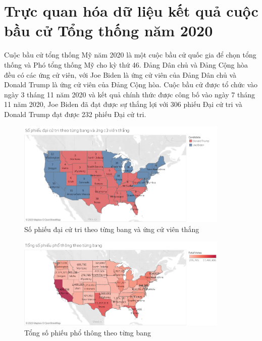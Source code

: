 \documentclass[14pt, a4paper]{article}
\numberwithin{equation}{section}
\numberwithin{figure}{section}
\numberwithin{dl}{section}
\numberwithin{md}{section}
\numberwithin{bd}{section}
\numberwithin{dn}{section}
\numberwithin{hq}{section}
\begin{document}
    \section{Trực quan hóa dữ liệu kết quả cuộc bầu cử Tổng thống năm 2020}

    Cuộc bầu cử tổng thống Mỹ năm 2020 là một cuộc bầu cử quốc gia để chọn tổng thống và Phó tổng thống Mỹ cho kỳ thứ 46. 
    Đảng Dân chủ và Đảng Cộng hòa đều có các ứng cử viên, với Joe Biden là ứng cử viên của Đảng Dân chủ và Donald Trump là ứng cử viên của Đảng Cộng hòa. 
    Cuộc bầu cử được tổ chức vào ngày 3 tháng 11 năm 2020 và kết quả chính thức được công bố vào ngày 7 tháng 11 năm 2020, Joe Biden đã đạt được sự thắng lợi với 306 phiếu Đại cử tri và Donald Trump đạt được 232 phiếu Đại cử tri.

    \begin{figure}[h!]
        \centering
        \includegraphics[width=0.9\textwidth]{Electoral_Votes_States.png}
        \caption{Số phiếu đại cử tri theo từng bang và ứng cử viên thắng}
    \end{figure}

    \begin{figure}[h!]
        \centering
        \includegraphics[width=0.9\textwidth]{Popular_Votes_States_by_Color.png}
        \caption{Tổng số phiếu phổ thông theo từng bang}
    \end{figure}
\end{document}
